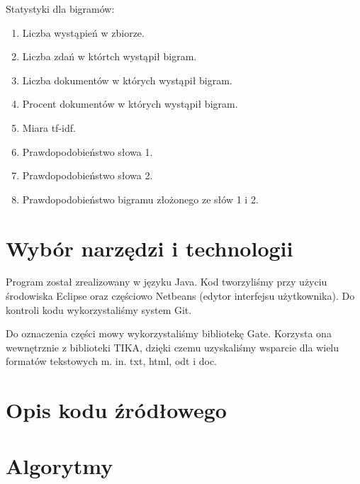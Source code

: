 \documentclass[11pt]{article}
\begin{document}
Statystyki dla bigramów:
\begin{enumerate}
 \item Liczba wystąpień w zbiorze.
 \item Liczba zdań w którtch wystąpił bigram.
 \item Liczba dokumentów w których wystąpił bigram.
 \item Procent dokumentów w których wystąpił bigram.
 \item Miara tf-idf.
 \item Prawdopodobieństwo słowa 1.
 \item Prawdopodobieństwo słowa 2.
 \item Prawdopodobieństwo bigramu złożonego ze słów 1 i 2.
\end{enumerate}

\section{Wybór narzędzi i technologii}
Program został zrealizowany w języku Java.
Kod tworzyliśmy przy użyciu środowiska Eclipse oraz częściowo Netbeans (edytor interfejsu użytkownika).
Do kontroli kodu wykorzystaliśmy system Git.

Do oznaczenia części mowy wykorzystaliśmy bibliotekę Gate.
Korzysta ona wewnętrznie z biblioteki TIKA, dzięki czemu uzyskaliśmy wsparcie dla wielu formatów tekstowych m. in. txt, html, odt i doc.

\section{Opis kodu źródłowego}

\section{Algorytmy}
\end{document}
